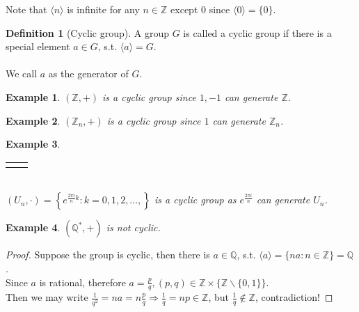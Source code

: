 \documentclass{article}
\theoremstyle{MyNonumberplain}
\theoremstyle{break}
\newtheorem*{proof}{Proof. }
\newcommand{\Z}{\mathbb{Z}}
\newcommand{\cyclic}[1]{\langle #1 \rangle}
\newcommand{\nline}{\begin{tabular}{ll}&\\\end{tabular}}
\newcommand{\nin}{\not\in}
\theoremstyle{break}
\newtheorem{example}{Example}[section]
\theoremstyle{break}
\theoremstyle{definition}
\theoremstyle{break}
\newtheorem{definition}{Definition}[section]
\begin{document}
Note that $\cyclic{n}$ is infinite for any $n\in\Z$ except 0 since $\cyclic{0}=\{0\}$.

\begin{defbox}
    \begin{definition}[Cyclic group]
        A group $G$ is called a cyclic group if there is a special element $a\in G$, s.t. $\cyclic{a}=G$.\\\\
        We call $a$ as the generator of $G$.
    \end{definition}
\end{defbox}

\begin{expbox}
    \begin{example}
        $(\Z,+)$ is a cyclic group since $1,-1$ can generate $\Z$.
    \end{example}
\end{expbox}

\begin{expbox}
    \begin{example}
        $(\Z_n,+)$ is a cyclic group since $1$ can generate $\Z_n$.
    \end{example}
\end{expbox}

\begin{expbox}
    \begin{example}
        \nline\\
        $(U_n, \cdot) = \left\{ e^{\frac{2 \pi i}{n} k} : k = 0, 1, 2, \ldots, \right\}$ is a cyclic group as $e^{\frac{2 \pi i}{n}}$ can generate $U_n$.
    \end{example}
\end{expbox}

\newpage

\begin{expbox}
    \begin{example}
        $(\mathbb{Q}^{\ast}, +)$ is not cyclic.
    \end{example}
    \begin{prfbox}
        \begin{proof}
            Suppose the group is cyclic, then there is $ a \in \mathbb{Q}$, s.t. $\cyclic{a} = \{ n a : n \in \mathbb{Z} \} =\mathbb{Q}$.\\
    
            Since $a$ is rational, therefore $a = \frac{p}{q}, (p, q) \in \mathbb{Z} \times \{\mathbb{Z} \backslash \{ 0,1 \}\}$.\\
    
            Then we may write $\frac{1}{q^2} = n a = n \frac{p}{q} \Rightarrow \frac{1}{q} = n p \in \mathbb{Z}$, but $\frac{1}{q} \nin \mathbb{Z}$, contradiction!
        \end{proof}
    \end{prfbox}
    
\end{expbox}
\end{document}
